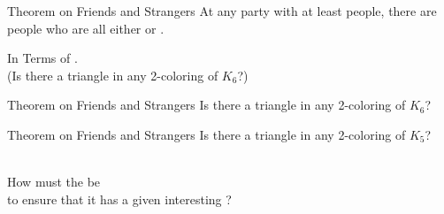 
\begin{frame}
  \begin{exampleblock}{Theorem on Friends and Strangers}
    At any party with at least  people,
    there are  people
    who are all either  or .
  \end{exampleblock}

  \pause
  \begin{center}
    In Terms of .  \\[6pt]
    (Is there a  triangle in any 2-coloring of $K_{6}$?)
  \end{center}
\end{frame}

\begin{frame}
  \begin{exampleblock}{Theorem on Friends and Strangers}
    Is there a  triangle in any 2-coloring of $K_{6}$?
  \end{exampleblock}
\end{frame}

\begin{frame}
  \begin{exampleblock}{Theorem on Friends and Strangers}
    Is there a  triangle in any 2-coloring of $K_{5}$?
  \end{exampleblock}

  \pause
\end{frame}

\begin{frame}
  \begin{center}
    \href{https://en.wikipedia.org/wiki/Ramsey\_theory}{} \\[15pt]

    How  must the  be \\[5pt]
    to ensure that it has a given interesting ?

    \pause
    \vspace{0.60cm}
  \end{center}
\end{frame}
